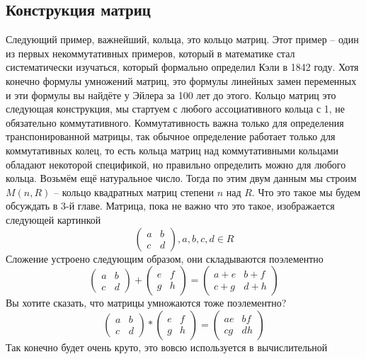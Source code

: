 \subsection{Конструкция матриц}
Следующий пример, важнейший, кольца, это кольцо матриц. Этот пример –
один из первых некоммутативных примеров, который в математике стал
систематически изучаться, который формально определил Кэли в 1842 году.
Хотя конечно формулы умножений матриц, это формулы линейных замен
переменных и эти формулы вы найдёте у Эйлера за 100 лет до этого. Кольцо
матриц это следующая конструкция, мы стартуем с любого ассоциативного
кольца с 1, не обязательно коммутативного. Коммутативность важна только
для определения транспонированной матрицы, так обычное определение
работает только для коммутативных колец, то есть кольца матриц над 
коммутативными кольцами обладают некоторой спецификой, но правильно
определить можно для любого кольца. Возьмём ещё натуральное число.
Тогда по этим двум данным мы строим $M(n,R)$ – кольцо квадратных матриц
степени $n$ над $R$. Что это такое мы будем обсуждать в 3-й главе.
Матрица, пока не важно что это такое, изображается следующей картинкой
\[\begin{pmatrix}
    a & b\\
    c & d
\end{pmatrix}, a,b,c,d\in R\]
Сложение устроено следующим образом, они складываются поэлементно
\[\begin{pmatrix}
    a & b\\
    c & d
\end{pmatrix} +
\begin{pmatrix}
    e & f\\
    g & h
\end{pmatrix} =
\begin{pmatrix}
    a+e & b+f\\
    c+g & d+h
\end{pmatrix}\]
Вы хотите сказать, что матрицы умножаются тоже поэлементно?
\[\begin{pmatrix}
    a & b\\
    c & d
\end{pmatrix} *
\begin{pmatrix}
    e & f\\
    g & h
\end{pmatrix} =
\begin{pmatrix}
    ae & bf\\
    cg & dh
\end{pmatrix}\]
Так конечно будет очень круто, это вовсю используется в вычислительной
